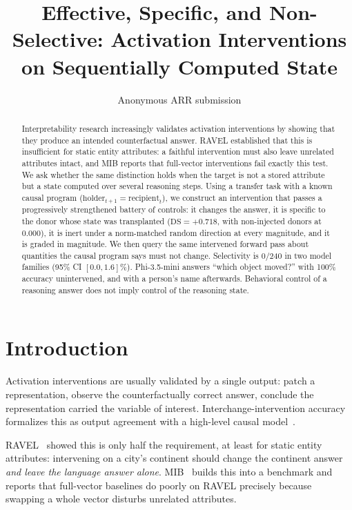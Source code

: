 \documentclass[11pt]{article}
\title{Effective, Specific, and Non-Selective: Activation Interventions on
       Sequentially Computed State}
\author{Anonymous ARR submission}
\begin{document}
\maketitle

\begin{abstract}
Interpretability research increasingly validates activation interventions by
showing that they produce an intended counterfactual answer. RAVEL established
that this is insufficient for static entity attributes: a faithful
intervention must also leave unrelated attributes intact, and MIB reports that
full-vector interventions fail exactly this test. We ask whether the same
distinction holds when the target is not a stored attribute but a state
computed over several reasoning steps. Using a transfer task with a known
causal program ($\mathrm{holder}_{t+1} = \mathrm{recipient}_t$), we construct
an intervention that passes a progressively strengthened battery of controls:
it changes the answer, it is specific to the donor whose state was
transplanted ($\mathrm{DS} = +0.718$, with non-injected donors at $0.000$), it
is inert under a norm-matched random direction at every magnitude, and it is
graded in magnitude. We then query the same intervened forward pass about
quantities the causal program says must not change. Selectivity is 0/240 in
two model families (95\% CI $[0.0, 1.6]$\%). Phi-3.5-mini answers
\enquote{which object moved?} with 100\% accuracy unintervened, and with a
person's name afterwards. Behavioral control of a reasoning answer does not
imply control of the reasoning state.
\end{abstract}

\section{Introduction}
\label{sec:introduction}

Activation interventions are usually validated by a single output: patch a
representation, observe the counterfactually correct answer, conclude the
representation carried the variable of interest. Interchange-intervention
accuracy formalizes this as output agreement with a high-level causal
model~\citep{geiger2021causalabstraction}.

RAVEL~\citep{huang2024ravel} showed this is only half the requirement, at
least for static entity attributes: intervening on a city's continent should
change the continent answer \emph{and leave the language answer alone}.
MIB~\citep{mueller2025mib} builds this into a benchmark and reports that
full-vector baselines do poorly on RAVEL precisely because swapping a whole
vector disturbs unrelated attributes.
\end{document}
